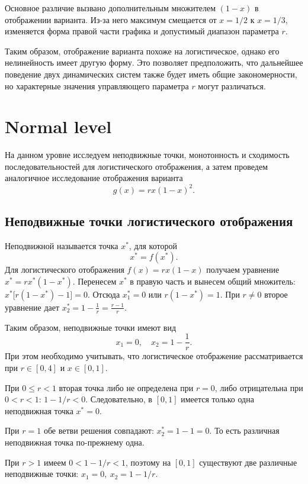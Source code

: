 \documentclass[14pt,a4paper]{extarticle}
\begin{document}
Основное различие вызвано дополнительным множителем $(1 - x)$ в отображении варианта. Из-за него максимум смещается от $x = 1/2$ к $x = 1/3$, изменяется форма правой части графика и допустимый диапазон параметра $r$.

Таким образом, отображение варианта похоже на логистическое, однако его нелинейность имеет другую форму. Это позволяет предположить, что дальнейшее поведение двух динамических систем также будет иметь общие закономерности, но характерные значения управляющего параметра $r$ могут различаться.

\clearpage



\section{Normal level}

На данном уровне исследуем неподвижные точки, монотонность и сходимость последовательностей для логистического отображения, а затем проведем аналогичное исследование отображения варианта
\[
g(x) = rx(1 - x)^2.
\]


\subsection{Неподвижные точки логистического отображения}

Неподвижной называется точка $x^*$, для которой
\[
x^* = f(x^*).
\]
Для логистического отображения $f(x) = rx(1 - x)$ получаем уравнение $x^* = rx^*(1 - x^*)$. Перенесем $x^*$ в правую часть и вынесем общий множитель: $x^* \bigl[ r(1 - x^*) - 1 \bigr] = 0$. Отсюда $x^*_1 = 0$ или $r(1 - x^*) = 1$. При $r \neq 0$ второе уравнение дает $x^*_2 = 1 - \frac{1}{r} = \frac{r-1}{r}$.

Таким образом, неподвижные точки имеют вид
\[
x_1 = 0, \quad x_2 = 1 - \frac{1}{r}.
\]
При этом необходимо учитывать, что логистическое отображение рассматривается при $r \in [0,4]$ и $x \in [0,1]$.

При $0 \leq r < 1$ вторая точка либо не определена при $r = 0$, либо отрицательна при $0 < r < 1$: $1 - 1/r < 0$. Следовательно, в $[0,1]$ имеется только одна неподвижная точка $x^* = 0$.

При $r = 1$ обе ветви решения совпадают: $x^*_2 = 1 - 1 = 0$. То есть различная неподвижная точка по-прежнему одна.

При $r > 1$ имеем $0 < 1 - 1/r < 1$, поэтому на $[0,1]$ существуют две различные неподвижные точки: $x_1 = 0,\ x_2 = 1 - 1/r$.
\end{document}
